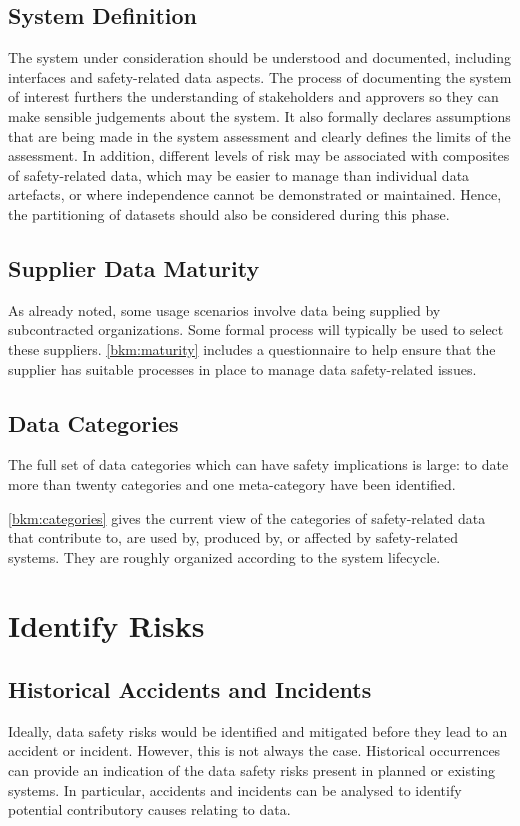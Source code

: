 \subsection{System Definition}
The system under consideration should be understood and documented, including interfaces and safety-related data aspects. The process of documenting the system of interest furthers the understanding of \glspl{stakeholder} and approvers so they can make sensible judgements about the system. It also formally declares assumptions that are being made in the system assessment and clearly defines the limits of the assessment. In addition, different levels of risk may be associated with composites of safety-related data, which may be easier to manage than individual \glspl{data artefact}, or where independence cannot be demonstrated or maintained. Hence, the partitioning of \glspl{dataset} should also be considered during this phase.

\subsection{Supplier Data Maturity}
As already noted, some usage scenarios involve data being supplied by subcontracted organizations. Some formal process will typically be used to select these suppliers. \autoref{bkm:maturity} includes a questionnaire to help ensure that the supplier has suitable processes in place to manage data safety-related issues.

\subsection{Data Categories}
\label{bkm:datacategories}
The full set of data categories which can have safety implications is large: to date more than twenty categories and one meta-category have been identified. 

\autoref{bkm:categories} gives the current view of the categories of safety-related data that contribute to, are used by, produced by, or affected by safety-related systems. They are roughly organized according to the system lifecycle. 
\section{Identify Risks}
\subsection{Historical Accidents and Incidents}
Ideally, data safety risks would be identified and mitigated before they lead to an accident or incident. However, this is not always the case. Historical occurrences can provide an indication of the data safety risks present in planned or existing systems. In particular, accidents and incidents can be analysed to identify potential contributory causes relating to data.

